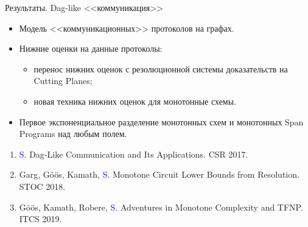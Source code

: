 \begin{frame}{Результаты. Dag-like <<коммуникация>>}
    \begin{itemize}
        \pause    
        \item Модель <<коммуникационных>> протоколов на графах.
        \pause
        \item Нижние оценки на данные протоколы:
            \begin{itemize}
                \item перенос нижних оценок с резолюционной системы доказательств на Cutting Planes;
                \item новая техника нижних оценок для монотонные схемы.
            \end{itemize}
        \pause
        \item Первое экспоненциальное разделение монотонных схем и монотонных Span Programs над любым
            полем.
    \end{itemize}

    \pause

    \begin{enumerate}
        \item \textcolor{blue}{S}. Dag-Like Communication and Its Applications. CSR 2017.
        \item Garg, G\"{o}\"{o}s, Kamath, \textcolor{blue}{S}. Monotone Circuit Lower Bounds from
            Resolution. STOC 2018.
        \item G\"{o}\"{o}s, Kamath, Robere, \textcolor{blue}{S}. Adventures in Monotone Complexity and
            TFNP. ITCS 2019.
    \end{enumerate}
\end{frame}


